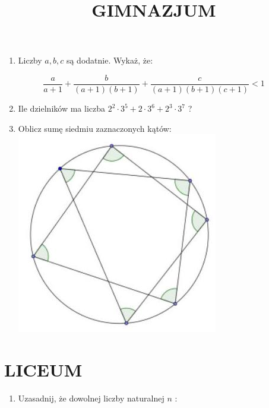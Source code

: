 \documentclass[10pt]{article}
\title{GIMNAZJUM }
\author{}
\date{}
\begin{document}
\maketitle
\begin{enumerate}
  \item Liczby \(a, b, c\) są dodatnie. Wykaż, że:
\end{enumerate}

\[
\frac{a}{a+1}+\frac{b}{(a+1)(b+1)}+\frac{c}{(a+1)(b+1)(c+1)}<1
\]

\begin{enumerate}
  \setcounter{enumi}{1}
  \item Ile dzielników ma liczba \(2^{2} \cdot 3^{5}+2 \cdot 3^{6}+2^{3} \cdot 3^{7}\) ?
  \item Oblicz sumę siedmiu zaznaczonych kątów:\\
\includegraphics[max width=\textwidth, center]{2024_11_21_558747d4ea4aa1afd47eg-1}
\end{enumerate}

\section*{LICEUM}
\begin{enumerate}
  \item Uzasadnij, że dowolnej liczby naturalnej \(n\) :
\end{enumerate}
\end{document}
